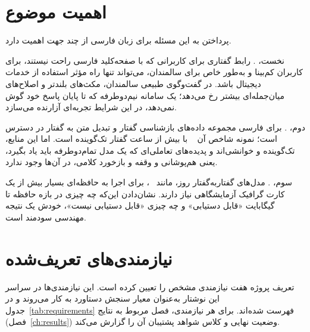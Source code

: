 \section{اهمیت موضوع}
\label{sec:motivation}

پرداختن به این مسئله برای زبان فارسی از چند جهت اهمیت دارد.

نخست، . رابط گفتاری برای کاربرانی که با صفحه‌کلید فارسی راحت
نیستند، برای کاربران کم‌بینا و به‌طور خاص برای سالمندان، می‌تواند تنها راه
مؤثر استفاده از خدمات دیجیتال باشد. در گفت‌وگوی طبیعی سالمندان، مکث‌های بلندتر
و اصلاح‌های میان‌جمله‌ای بیشتر رخ می‌دهد؛ یک سامانه نیم‌دوطرفه که تا پایان پاسخ
خود گوش نمی‌دهد، در این شرایط تجربه‌ای آزارنده می‌سازد.

دوم، . برای فارسی مجموعه داده‌های
بازشناسی گفتار و تبدیل متن به گفتار در دسترس است؛ نمونه شاخص آن
~\cite{qharabagh2025manatts} با بیش از  ساعت گفتار تک‌گوینده
است. اما این منابع، تک‌گوینده و خوانشی‌اند و پدیده‌های تعاملی‌ای که یک مدل
تمام‌دوطرفه باید یاد بگیرد، یعنی هم‌پوشانی و وقفه و بازخورد کلامی، در آن‌ها وجود
ندارد.

سوم، . مدل‌های گفتار‌به‌گفتار روز، مانند
~\cite{xu2025qwen25omni}، برای اجرا به حافظه‌ای بسیار بیش از
یک کارت گرافیک آزمایشگاهی نیاز دارند. نشان‌دادن این‌که چه چیزی در بازه حافظه
 تا  گیگابایت «قابل دستیابی» و چه چیزی «قابل دستیابی نیست»،
خودش یک نتیجه مهندسی سودمند است.

\section{نیازمندی‌های تعریف‌شده}
\label{sec:requirements}

تعریف پروژه هفت نیازمندی مشخص را تعیین کرده است. این نیازمندی‌ها در سراسر این
نوشتار به‌عنوان معیار سنجش دستاورد به کار می‌روند و در
جدول~\ref{tab:requirements} فهرست شده‌اند. برای هر نیازمندی، فصل مربوط به
نتایج (فصل~\ref{ch:results}) وضعیت نهایی و کلاس شواهد پشتیبان آن را گزارش
می‌کند.

